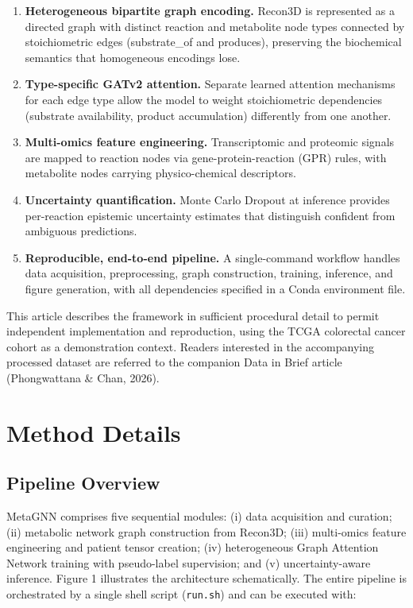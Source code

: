 \documentclass[12pt,a4paper]{article}
\begin{document}
\begin{enumerate}
\item \textbf{Heterogeneous bipartite graph encoding.} Recon3D is represented as a directed graph with distinct reaction and metabolite node types connected by stoichiometric edges (substrate\_of and produces), preserving the biochemical semantics that homogeneous encodings lose.

\item \textbf{Type-specific GATv2 attention.} Separate learned attention mechanisms for each edge type allow the model to weight stoichiometric dependencies (substrate availability, product accumulation) differently from one another.

\item \textbf{Multi-omics feature engineering.} Transcriptomic and proteomic signals are mapped to reaction nodes via gene-protein-reaction (GPR) rules, with metabolite nodes carrying physico-chemical descriptors.

\item \textbf{Uncertainty quantification.} Monte Carlo Dropout at inference provides per-reaction epistemic uncertainty estimates that distinguish confident from ambiguous predictions.

\item \textbf{Reproducible, end-to-end pipeline.} A single-command workflow handles data acquisition, preprocessing, graph construction, training, inference, and figure generation, with all dependencies specified in a Conda environment file.
\end{enumerate}

This article describes the framework in sufficient procedural detail to permit independent implementation and reproduction, using the TCGA colorectal cancer cohort as a demonstration context. Readers interested in the accompanying processed dataset are referred to the companion Data in Brief article (Phongwattana \& Chan, 2026).

\section{Method Details}

\subsection{Pipeline Overview}

MetaGNN comprises five sequential modules: (i) data acquisition and curation; (ii) metabolic network graph construction from Recon3D; (iii) multi-omics feature engineering and patient tensor creation; (iv) heterogeneous Graph Attention Network training with pseudo-label supervision; and (v) uncertainty-aware inference. Figure 1 illustrates the architecture schematically. The entire pipeline is orchestrated by a single shell script (\texttt{run.sh}) and can be executed with:
\end{document}

